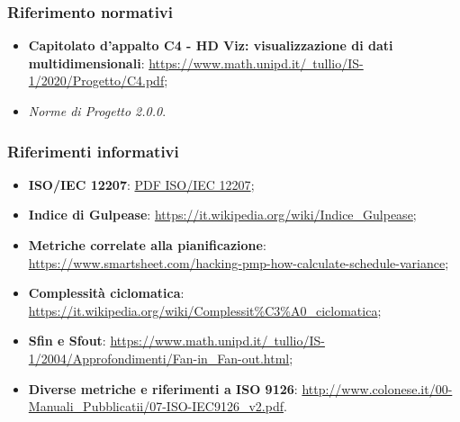         \subsubsection{Riferimento normativi}
            \begin{itemize}
                \item \textbf{Capitolato d'appalto C4 - HD Viz: visualizzazione di dati multidimensionali}:
                \href{https://www.math.unipd.it/~tullio/IS-1/2020/Progetto/C4.pdf}{https://www.math.unipd.it/~tullio/IS-1/2020/Progetto/C4.pdf};
                \item \textit{Norme di Progetto 2.0.0}.
            \end{itemize}
            
        \subsubsection{Riferimenti informativi}
            \begin{itemize}
                \item \textbf{ISO/IEC 12207}:
                \href{https://www.math.unipd.it/~tullio/IS-1/2009/Approfondimenti/ISO_12207-1995.pdf}{PDF ISO/IEC 12207};
                \item \textbf{Indice di Gulpease}:
                \href{https://it.wikipedia.org/wiki/Indice\_Gulpease}{https://it.wikipedia.org/wiki/Indice\_Gulpease};
                \item \textbf{Metriche correlate alla pianificazione}:
                \href{https://www.smartsheet.com/hacking-pmp-how-calculate-schedule-variance}{https://www.smartsheet.com/hacking-pmp-how-calculate-schedule-variance};
                \item \textbf{Complessità ciclomatica}: \href{https://it.wikipedia.org/wiki/Complessit\%C3\%A0\_ciclomatica}{https://it.wikipedia.org/wiki/Complessit\%C3\%A0\_ciclomatica};
                \item \textbf{Sfin e Sfout}: \href{https://www.math.unipd.it/~tullio/IS-1/2004/Approfondimenti/Fan-in\_Fan-out.html}{https://www.math.unipd.it/~tullio/IS-1/2004/Approfondimenti/Fan-in\_Fan-out.html};
                \item \textbf{Diverse metriche e riferimenti a ISO 9126}: \href{http://www.colonese.it/00-Manuali\_Pubblicatii/07-ISO-IEC9126\_v2.pdf}{http://www.colonese.it/00-Manuali\_Pubblicatii/07-ISO-IEC9126\_v2.pdf}.
            \end{itemize}
